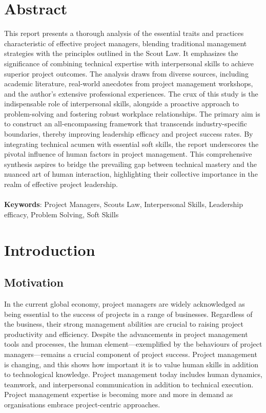 \documentclass{article}
\begin{document}
\section{Abstract}
This report presents a thorough analysis of the essential traits and practices characteristic of effective project managers, blending traditional management strategies with the principles outlined in the Scout Law. It emphasizes the significance of combining technical expertise with interpersonal skills to achieve superior project outcomes. The analysis draws from diverse sources, including academic literature, real-world anecdotes from project management workshops, and the author's extensive professional experiences. The crux of this study is the indispensable role of interpersonal skills, alongside a proactive approach to problem-solving and fostering robust workplace relationships. The primary aim is to construct an all-encompassing framework that transcends industry-specific boundaries, thereby improving leadership efficacy and project success rates. By integrating technical acumen with essential soft skills, the report underscores the pivotal influence of human factors in project management. This comprehensive synthesis aspires to bridge the prevailing gap between technical mastery and the nuanced art of human interaction, highlighting their collective importance in the realm of effective project leadership.
\\ \\
\textbf{Keywords}: Project Managers, Scouts Law, Interpersonal Skills, Leadership efficacy, Problem Solving, Soft Skills

\newpage

\section{Introduction}
\subsection{Motivation}
In the current global economy, project managers are widely acknowledged as being essential to the success of projects in a range of businesses. Regardless of the business, their strong management abilities are crucial to raising project productivity and efficiency. Despite the advancements in project management tools and processes, the human element—exemplified by the behaviours of project managers—remains a crucial component of project success. Project management is changing, and this shows how important it is to value human skills in addition to technological knowledge. Project management today includes human dynamics, teamwork, and interpersonal communication in addition to technical execution. Project management expertise is becoming more and more in demand as organisations embrace project-centric approaches. \cite{pant2008project}
\end{document}
